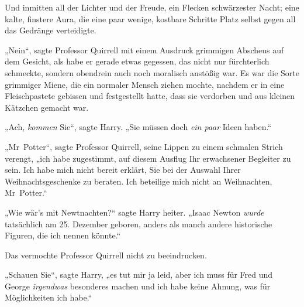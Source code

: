 Und inmitten all der Lichter und der Freude, ein Flecken schwärzester Nacht; eine kalte, finstere Aura, die eine paar wenige, kostbare Schritte Platz selbst gegen all das Gedränge verteidigte.

„Nein“, sagte Professor Quirrell mit einem Ausdruck grimmigen Abscheus auf dem Gesicht, als habe er gerade etwas gegessen, das nicht nur fürchterlich schmeckte, sondern obendrein auch noch moralisch anstößig war. Es war die Sorte grimmiger Miene, die ein normaler Mensch ziehen mochte, nachdem er in eine Fleischpastete gebissen und festgestellt hatte, dass sie verdorben und aus kleinen Kätzchen gemacht war.

„Ach, \emph{kommen} Sie“, sagte Harry. „Sie müssen doch \emph{ein paar} Ideen haben.“

„Mr~Potter“, sagte Professor Quirrell, seine Lippen zu einem schmalen Strich verengt, „ich habe zugestimmt, auf diesem Ausflug Ihr erwachsener Begleiter zu sein. Ich habe mich nicht bereit erklärt, Sie bei der Auswahl Ihrer Weihnachtsgeschenke zu beraten. Ich beteilige mich nicht an Weihnachten, Mr~Potter.“

„Wie wär’s mit Newtnachten?“ sagte Harry heiter. „Isaac Newton \emph{wurde} tatsächlich am 25. Dezember geboren, anders als manch andere historische Figuren, die ich nennen könnte.“

Das vermochte Professor Quirrell nicht zu beeindrucken.

„Schauen Sie“, sagte Harry, „es tut mir ja leid, aber ich muss für Fred und George \emph{irgendwas} besonderes machen und ich habe keine Ahnung, was für Möglichkeiten ich habe.“

